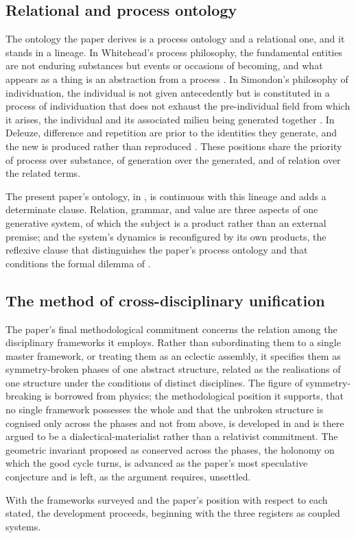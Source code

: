 \subsection{Relational and process ontology}
\label{p10:sec:bg-process}

The ontology the paper derives is a process ontology and a relational one, and it stands in a lineage. In Whitehead's process philosophy, the fundamental entities are not enduring substances but events or occasions of becoming, and what appears as a thing is an abstraction from a process \parencite{whitehead1978}. In Simondon's philosophy of individuation, the individual is not given antecedently but is constituted in a process of individuation that does not exhaust the pre-individual field from which it arises, the individual and its associated milieu being generated together \parencite{simondon2020}. In Deleuze, difference and repetition are prior to the identities they generate, and the new is produced rather than reproduced \parencite{deleuze1994}. These positions share the priority of process over substance, of generation over the generated, and of relation over the related terms.

The present paper's ontology, in , is continuous with this lineage and adds a determinate clause. Relation, grammar, and value are three aspects of one generative system, of which the subject is a product rather than an external premise; and the system's dynamics is reconfigured by its own products, the reflexive clause that distinguishes the paper's process ontology and that conditions the formal dilemma of .

\subsection{The method of cross-disciplinary unification}
\label{p10:sec:bg-method}

The paper's final methodological commitment concerns the relation among the disciplinary frameworks it employs. Rather than subordinating them to a single master framework, or treating them as an eclectic assembly, it specifies them as symmetry-broken phases of one abstract structure, related as the realisations of one structure under the conditions of distinct disciplines. The figure of symmetry-breaking is borrowed from physics; the methodological position it supports, that no single framework possesses the whole and that the unbroken structure is cognised only across the phases and not from above, is developed in  and is there argued to be a dialectical-materialist rather than a relativist commitment. The geometric invariant proposed as conserved across the phases, the holonomy on which the good cycle turns, is advanced as the paper's most speculative conjecture and is left, as the argument requires, unsettled.

With the frameworks surveyed and the paper's position with respect to each stated, the development proceeds, beginning with the three registers as coupled systems.
